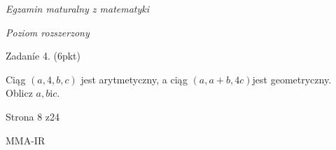 \documentclass[a4paper,12pt]{article}
\begin{document}
{\it Egzamin maturalny z matematyki}

{\it Poziom rozszerzony}

Zadaníe 4. (6pkt)

Ciąg $(a,4,b,c)$ jest arytmetyczny, a ciąg $(a,a+b,4c)$jest geometryczny. Oblicz $a, b\mathrm{i}c.$

Strona 8 z24

MMA-IR
\end{document}
